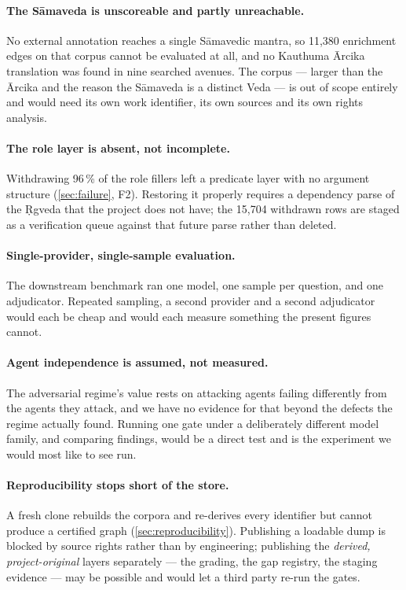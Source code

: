 \paragraph{The S\=amaveda is unscoreable and partly unreachable.} No external
annotation reaches a single S\=amavedic mantra, so 11{,}380 enrichment edges on that
corpus cannot be evaluated at all, and no Kauthuma \=Arcika translation was found in
nine searched avenues. The  corpus --- larger than the \=Arcika and the
reason the S\=amaveda is a distinct Veda --- is out of scope entirely and would need
its own work identifier, its own sources and its own rights analysis.

\paragraph{The role layer is absent, not incomplete.} Withdrawing 96\,\% of the role
fillers left a predicate layer with no argument structure
(\cref{sec:failure}, F2). Restoring it properly requires a dependency parse of the
\d{R}gveda that the project does not have; the 15{,}704 withdrawn rows are staged as
a verification queue against that future parse rather than deleted.

\paragraph{Single-provider, single-sample evaluation.} The downstream benchmark ran
one model, one sample per question, and one adjudicator. Repeated sampling, a second
provider and a second adjudicator would each be cheap and would each measure
something the present figures cannot.

\paragraph{Agent independence is assumed, not measured.} The adversarial regime's
value rests on attacking agents failing differently from the agents they attack, and
we have no evidence for that beyond the defects the regime actually found. Running
one gate under a deliberately different model family, and comparing findings, would
be a direct test and is the experiment we would most like to see run.

\paragraph{Reproducibility stops short of the store.} A fresh clone rebuilds the
corpora and re-derives every identifier but cannot produce a certified graph
(\cref{sec:reproducibility}). Publishing a loadable dump is blocked by source rights
rather than by engineering; publishing the \emph{derived, project-original} layers
separately --- the grading, the gap registry, the staging evidence --- may be
possible and would let a third party re-run the gates.

